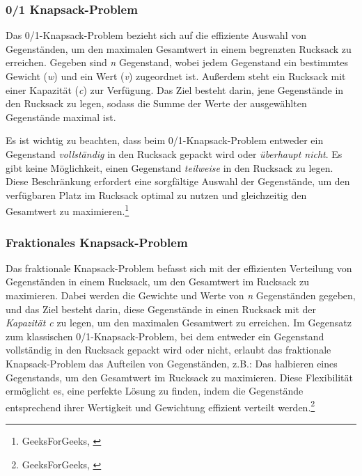 \subsubsection*{0/1 Knapsack-Problem}
Das 0/1-Knapsack-Problem bezieht sich auf die effiziente Auswahl von Gegenständen, um den maximalen Gesamtwert in einem
begrenzten Rucksack zu erreichen. Gegeben sind \textit{n} Gegenstand, wobei jedem Gegenstand ein bestimmtes Gewicht
(\textit{w}) und ein Wert (\textit{v}) zugeordnet ist. Außerdem steht ein Rucksack mit einer Kapazität (\textit{c}) zur
Verfügung. Das Ziel besteht darin, jene Gegenstände in den Rucksack zu legen, sodass die Summe der Werte der ausgewählten
Gegenstände maximal ist.

Es ist wichtig zu beachten, dass beim 0/1-Knapsack-Problem entweder ein Gegenstand \textit{vollständig} in den Rucksack
gepackt wird oder \textit{überhaupt nicht}. Es gibt keine Möglichkeit, einen Gegenstand \textit{teilweise} in den Rucksack
zu legen. Diese Beschränkung erfordert eine sorgfältige Auswahl der Gegenstände, um den verfügbaren Platz im Rucksack
optimal zu nutzen und gleichzeitig den Gesamtwert zu maximieren.\footnote{GeeksForGeeks, \cite{0/1 Knapsack-Problem}}

\subsubsection*{Fraktionales Knapsack-Problem}
Das fraktionale Knapsack-Problem befasst sich mit der effizienten Verteilung von Gegenständen in einem Rucksack, um den
Gesamtwert im Rucksack zu maximieren. Dabei werden die Gewichte und Werte von \textit{n} Gegenständen gegeben, und das
Ziel besteht darin, diese Gegenstände in einen Rucksack mit der \textit{Kapazität c} zu legen, um den maximalen Gesamtwert
zu erreichen. Im Gegensatz zum klassischen 0/1-Knapsack-Problem, bei dem entweder ein Gegenstand vollständig in den Rucksack
gepackt wird oder nicht, erlaubt das fraktionale Knapsack-Problem das Aufteilen von Gegenständen, z.B.: Das halbieren
eines Gegenstands, um den Gesamtwert im Rucksack zu maximieren. Diese Flexibilität ermöglicht es, eine perfekte Lösung
zu finden, indem die Gegenstände entsprechend ihrer Wertigkeit und Gewichtung effizient verteilt werden.\footnote{GeeksForGeeks, \cite{Fractional Knapsack Problem}}

